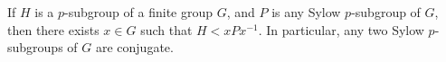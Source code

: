 If $H$ is a $p$-subgroup of a finite group $G$, and $P$ is any Sylow $p$-subgroup of $G$, then there exists $x \in G$ such that $H < xPx^{-1}$. In particular, any two Sylow $p$-subgroups of $G$ are conjugate.
